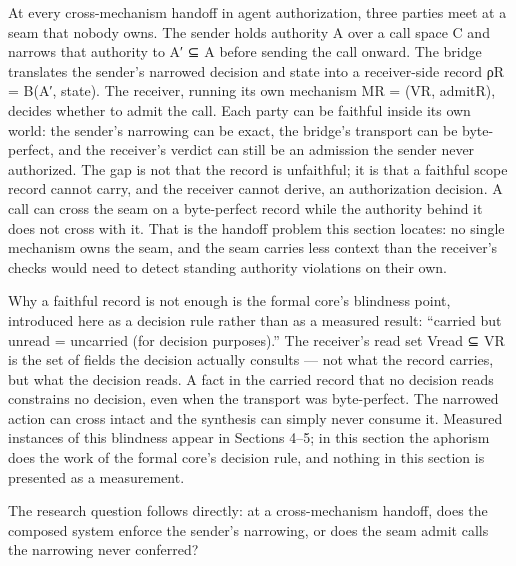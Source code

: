\documentclass[
  10pt,
]{article}
\renewcommand{\_}{\origunderscore\allowbreak}
\begin{document}
At every cross-mechanism handoff in agent authorization, three parties
meet at a seam that nobody owns. The sender holds authority A over a
call space C and narrows that authority to A′ ⊆ A before sending the
call onward. The bridge translates the sender's narrowed decision and
state into a receiver-side record ρ\_R = B(A′, state). The receiver,
running its own mechanism M\_R = (V\_R, admit\_R), decides whether to
admit the call. Each party can be faithful inside its own world: the
sender's narrowing can be exact, the bridge's transport can be
byte-perfect, and the receiver's verdict can still be an admission the
sender never authorized. The gap is not that the record is unfaithful;
it is that a faithful scope record cannot carry, and the receiver cannot
derive, an authorization decision. A call can cross the seam on a
byte-perfect record while the authority behind it does not cross with
it. That is the handoff problem this section locates: no single
mechanism owns the seam, and the seam carries less context than the
receiver's checks would need to detect standing authority violations on
their own.

Why a faithful record is not enough is the formal core's blindness
point, introduced here as a decision rule rather than as a measured
result: ``carried but unread = uncarried (for decision purposes).'' The
receiver's read set V\_read ⊆ V\_R is the set of fields the decision
actually consults --- not what the record carries, but what the decision
reads. A fact in the carried record that no decision reads constrains no
decision, even when the transport was byte-perfect. The narrowed action
can cross intact and the synthesis can simply never consume it. Measured
instances of this blindness appear in Sections 4--5; in this section the
aphorism does the work of the formal core's decision rule, and nothing
in this section is presented as a measurement.

The research question follows directly: at a cross-mechanism handoff,
does the composed system enforce the sender's narrowing, or does the
seam admit calls the narrowing never conferred?
\end{document}

